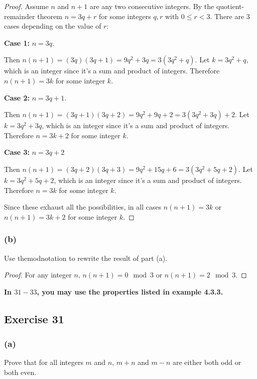 \documentclass[14pt]{extarticle}
\newcommand{\cy}{\color{cyan}}
\begin{document}
\begin{proof}
    Assume $n$ and $n+1$ are any two consecutive integers. By the quotient-remainder theorem $n = 3q+r$ for some integers $q,r$ with $0 \leq r < 3$. There are 3 cases depending on the value of $r$:

    {\bf Case 1:} $n = 3q$.

    Then $n(n+1) = (3q)(3q+1) = 9q^2 + 3q = 3(3q^2 + q)$. Let $k = 3q^2 + q$, which is an integer since it's a sum and product of integers. Therefore $n(n+1) = 3k$ for some integer $k$.

        {\bf Case 2:} $n = 3q + 1$.

    Then $n(n+1) = (3q+1)(3q+2) = 9q^2 + 9q + 2 = 3(3q^2 + 3q) + 2$. Let $k = 3q^2 + 3q$, which is an integer since it's a sum and product of integers. Therefore $n = 3k + 2$ for some integer $k$.

        {\bf Case 3:} $n = 3q + 2$

    Then $n(n+1) = (3q+2)(3q+3) = 9q^2 + 15q + 6 = 3(3q^2 + 5q + 2)$. Let $k = 3q^2 + 5q + 2$, which is an integer since it's a sum and product of integers. Therefore $n = 3k$ for some integer $k$.

    Since these exhaust all the possibilities, in all cases $n(n+1) = 3k$ or $n(n+1) = 3k+2$ for some integer $k$.
\end{proof}

\subsubsection{(b)}
Use the$ $mod$ $notation to rewrite the result of part (a).

\begin{proof}
    For any integer $n$, $n(n+1) = 0 \mod 3$ or $n(n+1) = 2 \mod 3$.
\end{proof}

{\bf \cy In $31-33$, you may use the properties listed in example 4.3.3.}

\subsection{Exercise 31}

\subsubsection{(a)}
Prove that for all integers $m$ and $n$, $m + n$ and $m - n$ are either both odd or both even.
\end{document}
